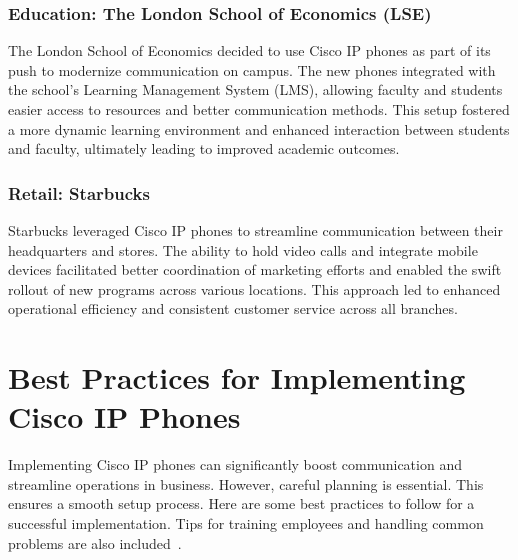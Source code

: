 \documentclass[11pt,a4paper]{article}
\begin{document}
\subsubsection*{Education: The London School of Economics (LSE)}

The London School of Economics decided to use Cisco IP phones as part of its push to modernize communication on campus. The new phones integrated with the school’s Learning Management System (LMS), allowing faculty and students easier access to resources and better communication methods. This setup fostered a more dynamic learning environment and enhanced interaction between students and faculty, ultimately leading to improved academic outcomes.


\subsubsection*{Retail: Starbucks}

Starbucks leveraged Cisco IP phones to streamline communication between their headquarters and stores. The ability to hold video calls and integrate mobile devices facilitated better coordination of marketing efforts and enabled the swift rollout of new programs across various locations. This approach led to enhanced operational efficiency and consistent customer service across all branches.


\section*{Best Practices for Implementing Cisco IP Phones}
Implementing Cisco IP phones can significantly boost communication and streamline operations in business. However, careful planning is essential. This ensures a smooth setup process. Here are some best practices to follow for a successful implementation. Tips for training employees and handling common problems are also included~\cite{Design}.
\end{document}
